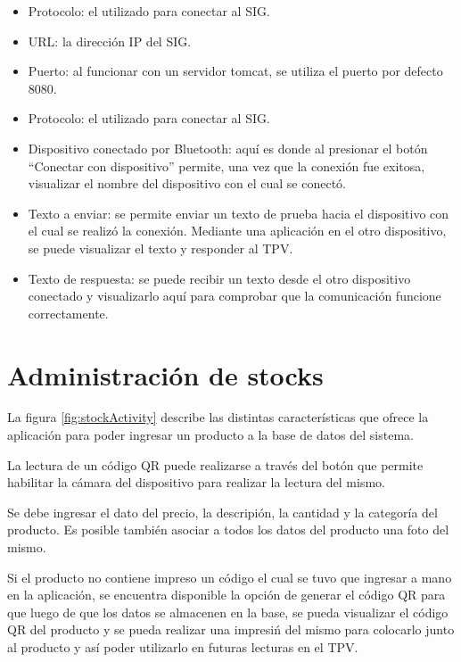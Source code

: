 \begin{itemize}
\item Protocolo: el utilizado para conectar al \ac{SIG}.
\item \ac{URL}: la direcci\'on IP del \ac{SIG}.
\item Puerto: al funcionar con un servidor tomcat, se utiliza el puerto por defecto 8080.
\item Protocolo: el utilizado para conectar al \ac{SIG}.
\item Dispositivo conectado por Bluetooth: aqu\'i es donde al presionar el bot\'on ``Conectar con dispositivo'' permite, una vez que la conexi\'on fue exitosa, visualizar el nombre del dispositivo con el cual se conect\'o.
\item Texto a enviar: se permite enviar un texto de prueba hacia el dispositivo con el cual se realiz\'o la conexi\'on. Mediante una aplicaci\'on en el otro dispositivo, se puede visualizar el texto y responder al \ac{TPV}.
\item Texto de respuesta: se puede recibir un texto desde el otro dispositivo conectado y visualizarlo aqu\'i para comprobar que la comunicaci\'on funcione correctamente.
\end{itemize}


\section{Administraci\'on de stocks}
\label{sec:ui.stocks}

La figura \ref{fig:stockActivity} describe las distintas caracter\'isticas que ofrece la aplicaci\'on para poder ingresar un producto a la base de datos del sistema.

La lectura de un c\'odigo \ac{QR} puede realizarse a trav\'es del bot\'on que permite habilitar la c\'amara del dispositivo para realizar la lectura del mismo.

Se debe ingresar el dato del precio, la descripi\'on, la cantidad y la categor\'ia del producto. Es posible tambi\'en asociar a todos los datos del producto una foto del mismo.

Si el producto no contiene impreso un c\'odigo el cual se tuvo que ingresar a mano en la aplicaci\'on, se encuentra disponible la opci\'on de generar el c\'odigo \ac{QR} para que luego de que los datos se almacenen en la base, se pueda visualizar el c\'odigo \ac{QR} del producto y se pueda realizar una impresi\'n del mismo para colocarlo junto al producto y as\'i poder utilizarlo en futuras lecturas en el \ac{TPV}.

